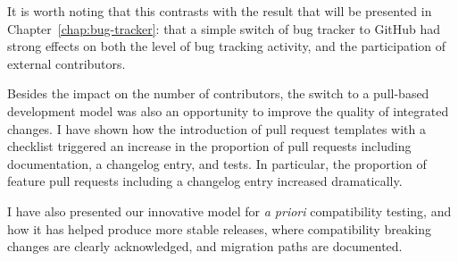 It is worth noting that this contrasts with the result that will be presented in Chapter~\ref{chap:bug-tracker}: that a simple switch of bug tracker to GitHub had strong effects on both the level of bug tracking activity, and the participation of external contributors.

Besides the impact on the number of contributors, the switch to a pull-based development model was also an opportunity to improve the quality of integrated changes.
I have shown how the introduction of pull request templates with a checklist triggered an increase in the proportion of pull requests including documentation, a changelog entry, and tests.
In particular, the proportion of feature pull requests including a changelog entry increased dramatically.

I have also presented our innovative model for \emph{a priori} compatibility testing, and how it has helped produce more stable releases, where compatibility breaking changes are clearly acknowledged, and migration paths are documented.
